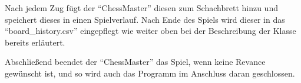 Nach jedem Zug fügt der ``ChessMaster'' diesen zum Schachbrett hinzu und speichert dieses in einen Spielverlauf. Nach Ende des Spiels wird dieser in das ``board\_history.csv'' eingepflegt wie weiter oben bei der Beschreibung der Klasse bereits erläutert.

Abschließend beendet der ``ChessMaster'' das Spiel, wenn keine Revance gewünscht ist, und so wird auch das Programm im Anschluss daran geschlossen.


